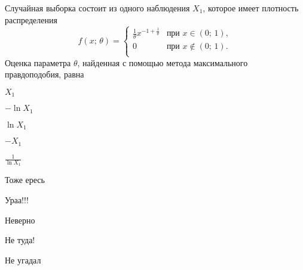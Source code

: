
\begin{question}
Случайная выборка состоит из одного наблюдения \(X_1\), которое имеет
плотность распределения \[
    f(x; \, \theta) = \begin{cases}
                          \frac{1}{\theta}x^{-1 + \frac{1}{\theta}} & \text{при } x \in (0;\,1),  \\
                          0 & \text{при }x \not\in (0;\,1). \\
                        \end{cases}
\] Оценка параметра \(\theta\), найденная с помощью метода максимального
правдоподобия, равна
\begin{answerlist}
  \item \(X_1\)
  \item \(-\ln X_1\)
  \item \(\ln X_1\)
  \item \(-X_1\)
  \item \(\frac{1}{\ln X_1}\)
\end{answerlist}
\end{question}

\begin{solution}
\begin{answerlist}
  \item Тоже ересь
  \item Ураа!!!
  \item Неверно
  \item Не туда!
  \item Не угадал
\end{answerlist}
\end{solution}

